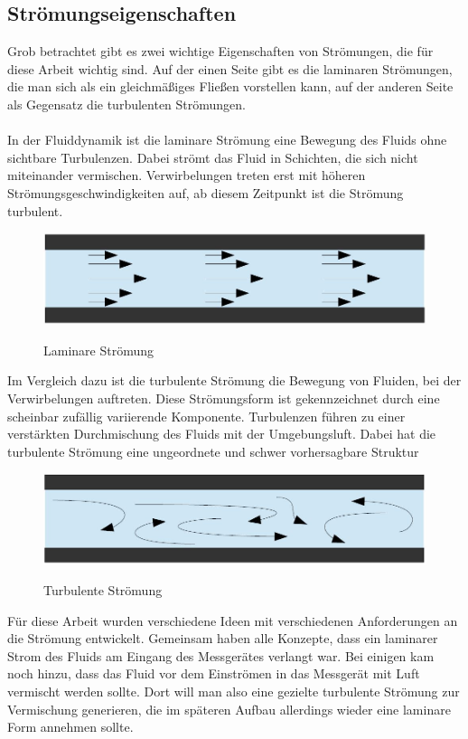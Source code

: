 \subsection{Str\"{o}mungseigenschaften}
Grob betrachtet gibt es zwei wichtige Eigenschaften von Str\"{o}mungen, die f\"{u}r diese Arbeit wichtig sind. Auf der einen Seite gibt es die laminaren Str\"{o}mungen, die man sich als ein gleichm\"{a}{\ss}iges Flie{\ss}en vorstellen kann, auf der anderen Seite als Gegensatz die turbulenten Str\"{o}mungen.
\\\\
In der Fluiddynamik ist die laminare Str\"{o}mung eine Bewegung des Fluids ohne sichtbare Turbulenzen. Dabei str\"{o}mt das Fluid in Schichten, die sich nicht miteinander vermischen. Verwirbelungen treten erst mit h\"{o}heren Str\"{o}mungsgeschwindigkeiten auf, ab diesem Zeitpunkt ist die Str\"{o}mung turbulent.
\begin{figure}[H]
        \myfloatalign
        {\includegraphics[width=.9\linewidth]{gfx/fundamentals/laminar.jpg}} \quad
        \caption[Laminare Str\"{o}mung]
        {Laminare Str\"{o}mung}
        \label{fig:laminar}
\end{figure}
Im Vergleich dazu ist die turbulente Str\"{o}mung die Bewegung von Fluiden, bei der Verwirbelungen auftreten. Diese Str\"{o}mungsform ist gekennzeichnet durch eine scheinbar zuf\"{a}llig variierende Komponente. Turbulenzen f\"{u}hren zu einer verst\"{a}rkten Durchmischung des Fluids mit der Umgebungsluft. Dabei hat die turbulente Str\"{o}mung eine ungeordnete und schwer vorhersagbare Struktur
\begin{figure}[H]
        \myfloatalign
        {\includegraphics[width=.9\linewidth]{gfx/fundamentals/turbulent.jpg}} \quad
        \caption[Turbulente Str\"{o}mung]
        {Turbulente Str\"{o}mung}
        \label{fig:turbulent}
\end{figure}
F\"{u}r diese Arbeit wurden verschiedene Ideen mit verschiedenen Anforderungen an die Str\"{o}mung entwickelt. Gemeinsam haben alle Konzepte, dass ein laminarer Strom des Fluids am Eingang des Messger\"{a}tes verlangt war. Bei einigen kam noch hinzu, dass das Fluid vor dem Einstr\"{o}men in das Messger\"{a}t mit Luft vermischt werden sollte. Dort will man also eine gezielte turbulente Str\"{o}mung zur Vermischung generieren, die im sp\"{a}teren Aufbau allerdings wieder eine laminare Form annehmen sollte\cite{stream}.
